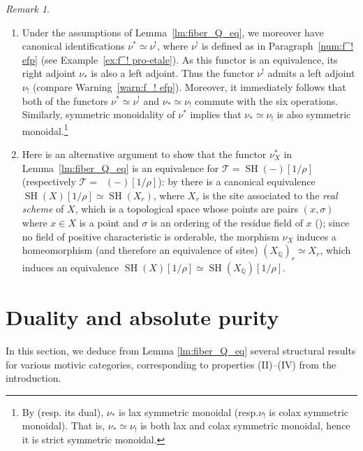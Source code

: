 \documentclass[11pt]{article}
\newcommand{\resp}{resp.\xspace}
\newcommand{\skpt}{\smallskip}
\numberwithin{equation}{section}\renewcommand{\encodingdefault}{TU}
\newcommand{\T}{\mathscr T}
\renewcommand{\AA}{\mathbb A}
\DeclareMathOperator{\SH}{SH}
\DeclareMathOperator{\DA}{D_{\AA^1}}
\newcommand{\QQ} {\mathbb Q}
\theoremstyle{remark}
\newtheorem{rem}[thm]{Remark}
\theoremstyle{definition}
\numberwithin{equation}{thm}
\begin{document}
\skpt
\begin{rem}\label{rem:nu^* six operations}
\begin{enumerate}
\item
Under the assumptions of Lemma~\ref{lm:fiber_Q_eq}, we moreover have canonical identifications $\nu^*\simeq\nu^!$, where $\nu^!$ is defined as in Paragraph~\ref{num:f^! efp} (see Example~\ref{ex:f^! pro-etale}).
As this functor is an equivalence, its right adjoint $\nu_*$ is also a left adjoint.
Thus the functor $\nu^!$ admits a left adjoint $\nu_!$ (compare Warning~\ref{warn:f_! efp}).
Moreover, it immediately follows that both of the functors $\nu^* \simeq \nu^!$ and $\nu_* \simeq \nu_!$ commute with the six operations.
Similarly, symmetric monoidality of $\nu^*$ implies that $\nu_*\simeq\nu_!$ is also symmetric monoidal.\footnote{By \cite[Prop.\,2.5.5.1]{LurieSAG} (\resp its dual), $\nu_*$ is lax symmetric monoidal (\resp $\nu_!$ is colax symmetric monoidal).
That is, $\nu_*\simeq\nu_!$ is both lax and colax symmetric monoidal, hence it is strict symmetric monoidal.}

\item
Here is an alternative argument to show that the functor $\nu_X^*$ in Lemma~\ref{lm:fiber_Q_eq} is an equivalence for $\T=\SH(-)[1/\rho]$ (respectively $\T=\DA(-)[1/\rho]$): by \cite[Th.\,35]{Bachmann} there is a canonical equivalence $\SH(X)[1/\rho]\simeq\SH(X_r)$, where $X_r$ is the site associated to the \emph{real scheme} of $X$, which is a topological space whose points are pairs $(x,\sigma)$ where $x\in X$ is a point and $\sigma$ is an ordering of the residue field of $x$ (\cite[0.4.1]{Scheiderer}); since no field of positive characteristic is orderable, the morphism $\nu_X$ induces a homeomorphism (and therefore an equivalence of sites) $(X_\QQ)_r\simeq X_r$, which induces an equivalence $\SH(X)[1/\rho]\simeq\SH(X_\QQ)[1/\rho]$.
\end{enumerate}
\end{rem}

\section{Duality and absolute purity}
\label{sec:abspur}

In this section, we deduce from Lemma \ref{lm:fiber_Q_eq} several structural results for various motivic categories, corresponding to properties (II)--(IV) from the introduction.
\end{document}
